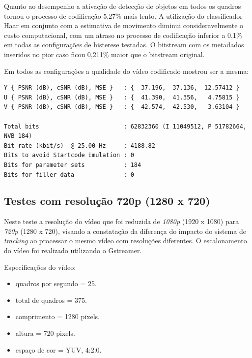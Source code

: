 Quanto ao desempenho a ativação de detecção de objetos em todos os quadros tornou o processo de codificação 5,27\% mais lento. A utilização do classificador Haar em conjunto com a estimativa de movimento diminui consideravelmente o custo computacional, com um atraso no processo de codificação inferior a 0,1\% em todas as configurações de histerese testadas. O bitstream com os metadados inseridos no pior caso ficou 0,211\% maior que o bitstream original.


Em todos as configurações a qualidade do vídeo codificado mostrou ser a mesma:

\begin{lstlisting}
Y { PSNR (dB), cSNR (dB), MSE }   : {  37.196,  37.136,  12.57412 }
U { PSNR (dB), cSNR (dB), MSE }   : {  41.390,  41.356,   4.75815 }
V { PSNR (dB), cSNR (dB), MSE }   : {  42.574,  42.530,   3.63104 }

Total bits                        : 62832360 (I 11049512, P 51782664, NVB 184) 
Bit rate (kbit/s)  @ 25.00 Hz     : 4188.82
Bits to avoid Startcode Emulation : 0 
Bits for parameter sets           : 184 
Bits for filler data              : 0
\end{lstlisting}


\subsection{ Testes com resolução 720p (1280 x 720) }


Neste teste a resolução do vídeo que foi reduzida de \textit{1080p} (1920 x 1080) para \textit{720p} (1280 x 720), visando a constatação da diferença do impacto do sistema de \textit{tracking} ao processar o mesmo vídeo com resoluções diferentes. O escalonamento do vídeo foi realizado utilizando o Gstreamer.


Especificações do vídeo:

\begin{itemize}
        \item quadros por segundo = 25.
        \item total de quadros    = 375.
        \item comprimento         = 1280 pixels.
        \item altura              = 720 pixels.
        \item espaço de cor       = YUV, 4:2:0.
\end{itemize}


